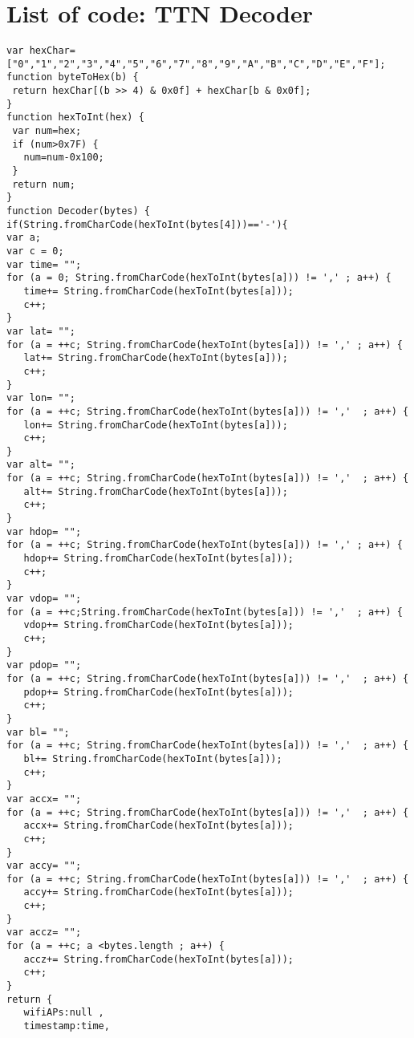\chapter{List of code: TTN Decoder }
\label{app:TTN_decoder}

\lstset{language=Python, caption=TTN Decoder, label=lst:ttn}
\begin{lstlisting}
var hexChar=["0","1","2","3","4","5","6","7","8","9","A","B","C","D","E","F"];
function byteToHex(b) {
 return hexChar[(b >> 4) & 0x0f] + hexChar[b & 0x0f];
}
function hexToInt(hex) {
 var num=hex;
 if (num>0x7F) {
   num=num-0x100;
 }
 return num;
}
function Decoder(bytes) {
if(String.fromCharCode(hexToInt(bytes[4]))=='-'){
var a;
var c = 0;
var time= "";
for (a = 0; String.fromCharCode(hexToInt(bytes[a])) != ',' ; a++) {
   time+= String.fromCharCode(hexToInt(bytes[a]));
   c++;
}
var lat= "";
for (a = ++c; String.fromCharCode(hexToInt(bytes[a])) != ',' ; a++) {
   lat+= String.fromCharCode(hexToInt(bytes[a]));
   c++;
}
var lon= "";
for (a = ++c; String.fromCharCode(hexToInt(bytes[a])) != ','  ; a++) {
   lon+= String.fromCharCode(hexToInt(bytes[a]));
   c++;
}
var alt= "";
for (a = ++c; String.fromCharCode(hexToInt(bytes[a])) != ','  ; a++) {
   alt+= String.fromCharCode(hexToInt(bytes[a]));
   c++;
}
var hdop= "";
for (a = ++c; String.fromCharCode(hexToInt(bytes[a])) != ',' ; a++) {
   hdop+= String.fromCharCode(hexToInt(bytes[a]));
   c++;
}
var vdop= "";
for (a = ++c;String.fromCharCode(hexToInt(bytes[a])) != ','  ; a++) {
   vdop+= String.fromCharCode(hexToInt(bytes[a]));
   c++;
}
var pdop= "";
for (a = ++c; String.fromCharCode(hexToInt(bytes[a])) != ','  ; a++) {
   pdop+= String.fromCharCode(hexToInt(bytes[a]));
   c++;
}
var bl= "";
for (a = ++c; String.fromCharCode(hexToInt(bytes[a])) != ','  ; a++) {
   bl+= String.fromCharCode(hexToInt(bytes[a]));
   c++;
}
var accx= "";
for (a = ++c; String.fromCharCode(hexToInt(bytes[a])) != ','  ; a++) {
   accx+= String.fromCharCode(hexToInt(bytes[a]));
   c++;
}
var accy= "";
for (a = ++c; String.fromCharCode(hexToInt(bytes[a])) != ','  ; a++) {
   accy+= String.fromCharCode(hexToInt(bytes[a]));
   c++;
}
var accz= "";
for (a = ++c; a <bytes.length ; a++) {
   accz+= String.fromCharCode(hexToInt(bytes[a]));
   c++;
}
return {
   wifiAPs:null ,
   timestamp:time,

\end{lstlisting}
